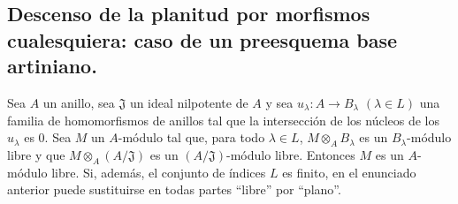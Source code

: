 \subsection{Descenso de la planitud por morfismos cualesquiera: caso de un preesquema base artiniano.}
\label{subsection:IV.11.4}


\begin{theorem}[11.4.1]
\label{IV.11.4.1}
Sea $A$ un anillo, sea $\mathfrak J$ un ideal nilpotente de $A$ y sea $u_\lambda:A\to B_\lambda$ $(\lambda\in L)$
una familia de homomorfismos de anillos tal que la intersección de los núcleos de los $u_\lambda$ es $0$.
Sea $M$ un $A$-módulo tal que, para todo $\lambda\in L$, $M\otimes_A B_\lambda$ es un $B_\lambda$-módulo libre y que $M\otimes_A(A/\mathfrak J)$
es un $(A/\mathfrak J)$-módulo libre. Entonces $M$ es un $A$-módulo libre. Si, además, el conjunto de índices $L$ es
finito, en el enunciado anterior puede sustituirse en todas partes ``libre'' por ``plano''.
\end{theorem}

